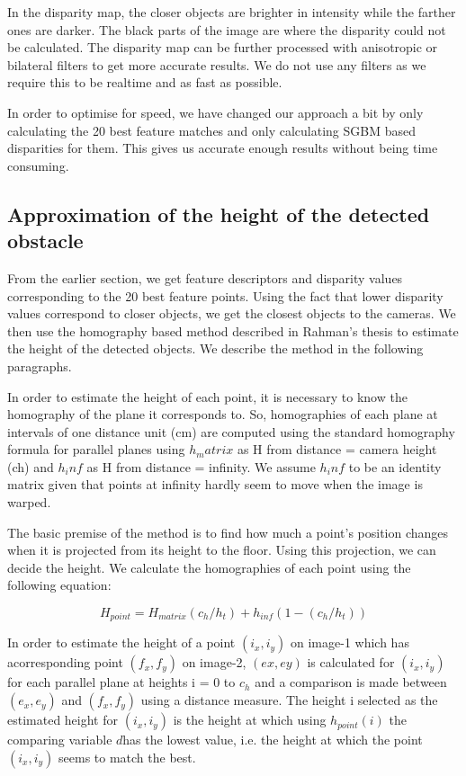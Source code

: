 \documentclass[11pt]{report}
\begin{document}
In the disparity map, the closer objects are brighter in intensity while the farther ones are darker. The black parts of the image are where the disparity could not be calculated. The disparity map can be further processed with anisotropic or bilateral filters to get more accurate results. We do not use any filters as we require this to be realtime and as fast as possible. 

In order to optimise for speed, we have changed our approach a bit by only calculating the 20 best feature matches and only calculating SGBM based disparities for them. This gives us accurate enough results without being time consuming. 


\subsection{Approximation of the height of the detected obstacle}

From the earlier section, we get feature descriptors and disparity values corresponding to the 20 best feature points. Using the fact that lower disparity values correspond to closer objects, we get the closest objects to the cameras. We then use the homography based method described in Rahman's thesis\cite{obstacleavoidance} to estimate the height of the detected objects. We describe the method in the following paragraphs.

In order to estimate the height of each point, it is necessary to know the homography of the plane it corresponds to. So, homographies of each plane at intervals of one distance unit (cm) are computed using the standard homography formula for parallel planes using $h_matrix$ as H from distance = camera height (ch) and $h_inf$ as H from distance = infinity. We assume $h_inf$ to be an identity matrix given that points at infinity hardly seem to move when the image is warped. 

The basic premise of the method is to find how much a point's position changes when it is projected from its height to the floor. Using this projection, we can decide the height. We calculate the homographies of each point using the following equation:

\begin{equation}
H_{point} = H_{matrix}(c_h/h_t) + h_{inf}(1-(c_h/h_t))
\end{equation}
 

In order to estimate the height of a point $(i_x,i_y)$ on image-1 which has acorresponding point $(f_x,f_y)$ on image-2, $(ex,ey)$ is calculated for $(i_x,i_y)$ for each parallel plane at heights i = 0 to $c_h$ and a comparison is made between $(e_x,e_y)$ and $(f_x,f_y)$ using a distance measure. The height i selected as the estimated height for $(i_x,i_y)$ is the height at which using $h_{point}(i)$ the comparing variable $d$has the lowest value, i.e. the height at which the point $(i_x,i_y)$ seems to match the best.
\end{document}
